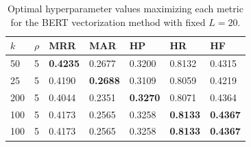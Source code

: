 \documentclass[11pt]{article}
\theoremstyle{plain}
\theoremstyle{definition}
\begin{document}
\begin{table}[H]
    \centering
    \begin{tabular}{| m{2em} | m{2em} | m{4em} | m{4em} | m{4em} | m{4em} | m{4em} |}
        \hline
        $k$ & $\rho$ & MRR             & MAR             & HP              & HR              & HF              \\
        \hline
        \hline
        50  & 5      & \textbf{0.4235} & 0.2677          & 0.3200          & 0.8132          & 0.4315          \\
        \hline
        25  & 5      & 0.4190          & \textbf{0.2688} & 0.3109          & 0.8059          & 0.4219          \\
        \hline
        200 & 5      & 0.4044          & 0.2351          & \textbf{0.3270} & 0.8071          & 0.4364          \\
        \hline
        100 & 5      & 0.4173          & 0.2565          & 0.3258          & \textbf{0.8133} & \textbf{0.4367} \\
        \hline
        100 & 5      & 0.4173          & 0.2565          & 0.3258          & \textbf{0.8133} & \textbf{0.4367} \\
        \hline
    \end{tabular}
    \caption{Optimal hyperparameter values maximizing each metric for the BERT vectorization method with fixed $L=20$.}\label{tab:bert_optimal}
\end{table}
\end{document}
